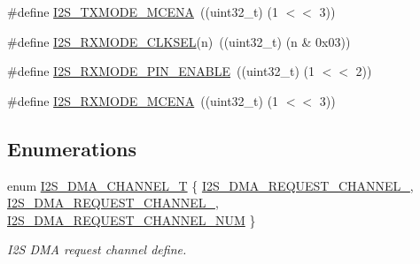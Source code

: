 \begin{DoxyCompactItemize}
\item 
\#define \hyperlink{group___i2_s__18_x_x__43_x_x_gabd67f37d51f2557f49fa600abb48225b}{I2\+S\+\_\+\+T\+X\+M\+O\+D\+E\+\_\+\+M\+C\+E\+NA}~((uint32\+\_\+t) (1 $<$$<$ 3))
\item 
\#define \hyperlink{group___i2_s__18_x_x__43_x_x_ga45351ee42b08814f1860c0d2a73379f0}{I2\+S\+\_\+\+R\+X\+M\+O\+D\+E\+\_\+\+C\+L\+K\+S\+EL}(n)~((uint32\+\_\+t) (n \& 0x03))
\item 
\#define \hyperlink{group___i2_s__18_x_x__43_x_x_ga2734ec0ee02ee7865c36b6ec3ffff081}{I2\+S\+\_\+\+R\+X\+M\+O\+D\+E\+\_\+P\+I\+N\+\_\+\+E\+N\+A\+B\+LE}~((uint32\+\_\+t) (1 $<$$<$ 2))
\item 
\#define \hyperlink{group___i2_s__18_x_x__43_x_x_ga64eb87a1f090271b07c7110f974f8300}{I2\+S\+\_\+\+R\+X\+M\+O\+D\+E\+\_\+\+M\+C\+E\+NA}~((uint32\+\_\+t) (1 $<$$<$ 3))
\end{DoxyCompactItemize}
\subsection*{Enumerations}
\begin{DoxyCompactItemize}
\item 
enum \hyperlink{group___i2_s__18_x_x__43_x_x_gac04c1583101ddd661886d9677683421b}{I2\+S\+\_\+\+D\+M\+A\+\_\+\+C\+H\+A\+N\+N\+E\+L\+\_\+T} \{ \hyperlink{group___i2_s__18_x_x__43_x_x_ggac04c1583101ddd661886d9677683421ba549b2d28b5da72f6185d736f5fed51c1}{I2\+S\+\_\+\+D\+M\+A\+\_\+\+R\+E\+Q\+U\+E\+S\+T\+\_\+\+C\+H\+A\+N\+N\+E\+L\+\_}, 
\hyperlink{group___i2_s__18_x_x__43_x_x_ggac04c1583101ddd661886d9677683421ba65eabb50f670f1dcae7b3c790f088e16}{I2\+S\+\_\+\+D\+M\+A\+\_\+\+R\+E\+Q\+U\+E\+S\+T\+\_\+\+C\+H\+A\+N\+N\+E\+L\+\_}, 
\hyperlink{group___i2_s__18_x_x__43_x_x_ggac04c1583101ddd661886d9677683421bab9921186ab93fee889b2074d508b88ce}{I2\+S\+\_\+\+D\+M\+A\+\_\+\+R\+E\+Q\+U\+E\+S\+T\+\_\+\+C\+H\+A\+N\+N\+E\+L\+\_\+\+N\+UM}
 \}\begin{DoxyCompactList}\small\item\em I2S D\+MA request channel define. \end{DoxyCompactList}
\end{DoxyCompactItemize}
